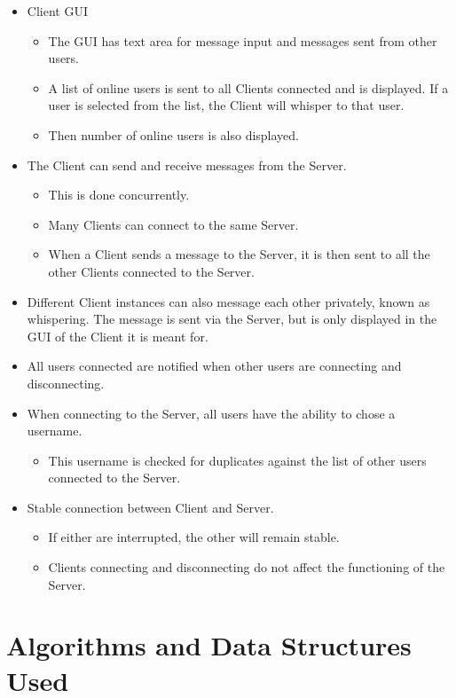 \documentclass[12pt]{article}
\begin{document}
\begin{itemize}
\item Client GUI
\begin{itemize}
\item The GUI has text area for message input and messages sent from other users.
\item A list of online users is sent to all Clients connected and is displayed.
If a user is selected from the list, the Client will whisper to that user.
\item Then number of online users is also displayed.
\end{itemize}
\item The Client can send and receive messages from the Server.
\begin{itemize}
\item This is done concurrently.
\item Many Clients can connect to the same Server.
\item When a Client sends a message to the Server, it is then sent to all the
other Clients connected to the Server.
\end{itemize}
\item Different Client instances can also message each other privately, known as whispering.
The message is sent via the Server, but is only displayed in the GUI of the Client it is meant for.
\item All users connected are notified when other users are connecting and disconnecting.
\item When connecting to the Server, all users have the ability to chose a username.
\begin{itemize}
\item This username is checked for duplicates against the list of other users connected to the
Server.
\end{itemize}
\item Stable connection between Client and Server.
\begin{itemize}
\item If either are interrupted, the other will remain stable.
\item Clients connecting and disconnecting do not affect the functioning
of the Server.
\end{itemize}
\end{itemize}

\section{Algorithms and Data Structures Used}
\end{document}
